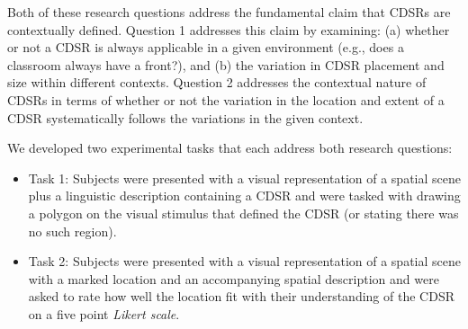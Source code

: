 \documentclass[11pt,letterpaper]{article}
\begin{document}
Both of these research questions address the fundamental claim that CDSRs are contextually defined. Question 1 addresses this claim by examining: (a) whether or not a CDSR is always applicable in a given environment (e.g., does a classroom always have a front?), and (b) the variation in CDSR placement and size within different contexts. Question 2 addresses the contextual nature of CDSRs in terms of whether or not the variation in the location and extent of a CDSR systematically follows the variations  in the given context. 



We developed two experimental tasks that each address both research questions:
\begin{itemize}
	\item{Task 1:} Subjects were presented with a visual representation of a spatial scene plus a linguistic description containing a CDSR and were tasked with drawing a polygon on the visual stimulus that defined the CDSR (or stating there was no such region).
	\item{Task 2:} Subjects were presented with a visual representation of a spatial scene with a marked location and an accompanying spatial description and were asked to rate how well the location fit with their understanding of the CDSR on a five point \textit{Likert scale}.
\end{itemize}
\end{document}

